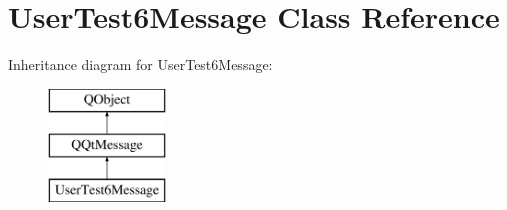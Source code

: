 \hypertarget{class_user_test6_message}{}\section{User\+Test6\+Message Class Reference}
\label{class_user_test6_message}
Inheritance diagram for User\+Test6\+Message\+:\begin{figure}[H]
\begin{center}
\leavevmode
\includegraphics[height=3.000000cm]{class_user_test6_message}
\end{center}
\end{figure}
